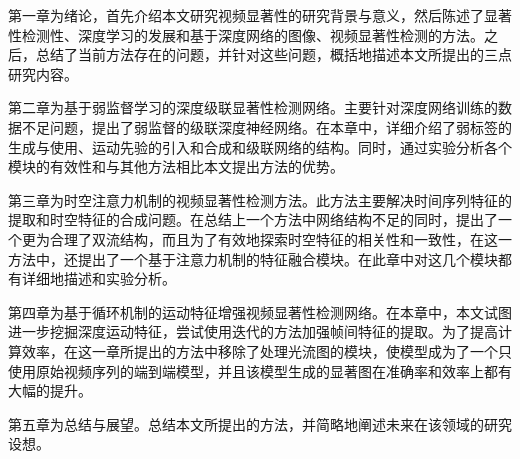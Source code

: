 第一章为绪论，首先介绍本文研究视频显著性的研究背景与意义，然后陈述了显著性检测性、深度学习的发展和基于深度网络的图像、视频显著性检测的方法。之后，总结了当前方法存在的问题，并针对这些问题，概括地描述本文所提出的三点研究内容。

第二章为基于弱监督学习的深度级联显著性检测网络。主要针对深度网络训练的数据不足问题，提出了弱监督的级联深度神经网络。在本章中，详细介绍了弱标签的生成与使用、运动先验的引入和合成和级联网络的结构。同时，通过实验分析各个模块的有效性和与其他方法相比本文提出方法的优势。

第三章为时空注意力机制的视频显著性检测方法。此方法主要解决时间序列特征的提取和时空特征的合成问题。在总结上一个方法中网络结构不足的同时，提出了一个更为合理了双流结构，而且为了有效地探索时空特征的相关性和一致性，在这一方法中，还提出了一个基于注意力机制的特征融合模块。在此章中对这几个模块都有详细地描述和实验分析。

第四章为基于循环机制的运动特征增强视频显著性检测网络。在本章中，本文试图进一步挖掘深度运动特征，尝试使用迭代的方法加强帧间特征的提取。为了提高计算效率，在这一章所提出的方法中移除了处理光流图的模块，使模型成为了一个只使用原始视频序列的端到端模型，并且该模型生成的显著图在准确率和效率上都有大幅的提升。

第五章为总结与展望。总结本文所提出的方法，并简略地阐述未来在该领域的研究设想。




